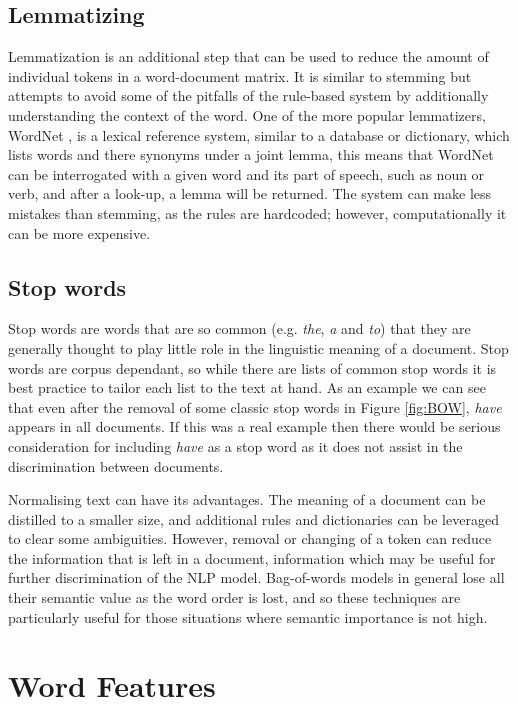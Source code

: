 \subsection{Lemmatizing} Lemmatization is an additional step that can be used to reduce the amount of individual tokens in a word-document matrix. It is similar to stemming but attempts to avoid some of the pitfalls of the rule-based system by additionally understanding the context of the word. One of the more popular lemmatizers, WordNet \parencite{MillerGeorgeA1990ItWA}, is a lexical reference system, similar to a database or dictionary, which lists words and there synonyms under a joint lemma, this means that WordNet can be interrogated with a given word and its part of speech, such as noun or verb, and after a look-up, a lemma will be returned. The system can make less mistakes than stemming, as the rules are hardcoded; however, computationally it can be more expensive.

\subsection{Stop words} Stop words are words that are so common (e.g. \emph{the}, \emph{a} and \emph{to}) that they are generally thought to play little role in the linguistic meaning of a document. Stop words are corpus dependant, so while there are lists of common stop words it is best practice to tailor each list to the text at hand. As an example we can see that even after the removal of some classic stop words in Figure \ref{fig:BOW}, \emph{have} appears in all documents. If this was a real example then there would be serious consideration for including \emph{have} as a stop word as it does not assist in the discrimination between documents. 

Normalising text can have its advantages. The meaning of a document can be distilled to a smaller size, and additional rules and dictionaries can be leveraged to clear some ambiguities. However, removal or changing of a token can reduce the information that is left in a document, information which may be useful for further discrimination of the NLP model. Bag-of-words models in general lose all their semantic value as the word order is lost, and so these techniques are particularly useful for those situations where semantic importance is not high.

\section{Word Features}

